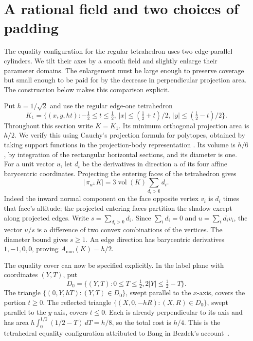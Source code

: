 \section{A rational field and two choices of padding}
\label{c:rat-rational}

The equality configuration for the regular tetrahedron uses two
edge-parallel cylinders.  We tilt their axes by a smooth field and
slightly enlarge their parameter domains.  The enlargement must be large
enough to preserve coverage but small enough to be paid for by the decrease
in perpendicular projection area.  The construction below makes this
comparison explicit.

Put $h=1/\sqrt2$ and use the regular edge-one tetrahedron
\begin{equation}\label{c:rat-tetrahedron}
 K_1=\{(x,y,ht):-\tfrac12\le t\le\tfrac12,
       \ |x|\le(\tfrac12+t)/2,\ |y|\le(\tfrac12-t)/2\}.
\end{equation}
Throughout this section write $K=K_1$. Its minimum orthogonal projection area is $h/2$.  We verify this using
Cauchy's projection formula for polytopes, obtained by taking support
functions in the projection-body representation
\cite[equation~(1), p.~83, and Section~3]{Martini1991}.  Its volume is $h/6$, by integration
of the rectangular horizontal sections, and its diameter is one.
For a unit vector $u$, let $d_i$ be the derivatives in direction $u$ of
its four affine barycentric coordinates.  Projecting the entering faces
of the tetrahedron gives
\[
 |\pi_{u^\perp}K|=3\operatorname{vol}(K)\sum_{d_i>0}d_i.
\]
Indeed the inward normal component on the face opposite vertex $v_i$
is $d_i$ times that face's altitude; the projected entering faces
partition the shadow except along projected edges.  Write
$s=\sum_{d_i>0}d_i$.  Since $\sum_i d_i=0$ and
$u=\sum_i d_i v_i$, the vector $u/s$ is a difference of two convex
combinations of the vertices.  The diameter bound gives $s\ge1$.
An edge direction has barycentric derivatives $1,-1,0,0$, proving
$A_{\min}(K)=h/2$.

The equality cover can now be specified explicitly. In the label plane
with coordinates $(Y,T)$, put
\[
 D_0=\{(Y,T):0\le T\le\tfrac12,
                        2|Y|\le\tfrac12-T\}.
\]
The triangle $\{(0,Y,hT):(Y,T)\in D_0\}$, swept parallel to the
$x$-axis, covers the portion $t\ge0$. The reflected triangle
$\{(X,0,-hR):(X,R)\in D_0\}$, swept parallel to the $y$-axis,
covers $t\le0$. Each is already perpendicular to its axis and has
area $h\int_0^{1/2}(1/2-T)\,dT=h/8$, so the total cost is $h/4$.
This is the tetrahedral equality configuration attributed to Bang in
Bezdek's account~\cite[Section~3]{Bezdek2009}.

